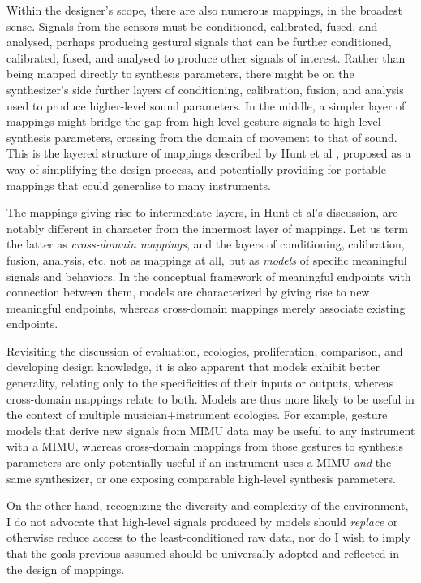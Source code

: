\documentclass[main.tex]{subfiles}
\begin{document}
Within the designer's scope, there are also numerous mappings, in the broadest
sense. Signals from the sensors must be conditioned, calibrated, fused, and
analysed, perhaps producing gestural signals that can be further conditioned,
calibrated, fused, and analysed to produce other signals of interest. Rather
than being mapped directly to synthesis parameters, there might be on the
synthesizer's side further layers of conditioning, calibration, fusion, and
analysis used to produce higher-level sound parameters. In the middle, a
simpler layer of mappings might bridge the gap from high-level gesture signals
to high-level synthesis parameters, crossing from the domain of movement to
that of sound. This is the layered structure of mappings described by Hunt et
al \cite{Hunt2002a}, proposed as a way of simplifying the design process, and
potentially providing for portable mappings that could generalise to many
instruments.

The mappings giving rise to intermediate layers, in Hunt et al's discussion, are notably
different in character from the innermost layer of mappings. Let us term the latter as
\emph{cross-domain mappings}, and the layers of conditioning, calibration, fusion, analysis, etc.
not as mappings at all, but as \emph{models} of specific meaningful signals and behaviors.
In the conceptual framework of meaningful endpoints with connection between them,
models are characterized by giving rise to new meaningful endpoints, whereas cross-domain
mappings merely associate existing endpoints.

Revisiting the discussion of evaluation, ecologies, proliferation, comparison, and developing design
knowledge, it is also apparent that models exhibit better generality, relating only to the
specificities of their inputs or outputs, whereas cross-domain mappings relate to both.
Models are thus more likely to be useful in the context of multiple musician+instrument
ecologies. For example, gesture models that derive new signals from MIMU data may be useful
to any instrument with a MIMU, whereas cross-domain mappings from those gestures to synthesis
parameters are only potentially useful if an instrument uses a MIMU \emph{and} the same synthesizer,
or one exposing comparable high-level synthesis parameters.

On the other hand, recognizing the diversity and complexity of the environment, I do not advocate
that high-level signals produced by models should \emph{replace} or otherwise reduce access to
the least-conditioned raw data, nor do I wish to imply that the goals previous assumed should
be universally adopted and reflected in the design of mappings.
\end{document}
